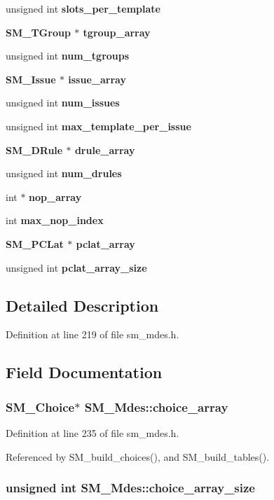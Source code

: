 \begin{CompactItemize}
unsigned int \bf{slots\_\-per\_\-template}
\item 
\bf{SM\_\-TGroup} $\ast$ \bf{tgroup\_\-array}
\item 
unsigned int \bf{num\_\-tgroups}
\item 
\bf{SM\_\-Issue} $\ast$ \bf{issue\_\-array}
\item 
unsigned int \bf{num\_\-issues}
\item 
unsigned int \bf{max\_\-template\_\-per\_\-issue}
\item 
\bf{SM\_\-DRule} $\ast$ \bf{drule\_\-array}
\item 
unsigned int \bf{num\_\-drules}
\item 
int $\ast$ \bf{nop\_\-array}
\item 
int \bf{max\_\-nop\_\-index}
\item 
\bf{SM\_\-PCLat} $\ast$ \bf{pclat\_\-array}
\item 
unsigned int \bf{pclat\_\-array\_\-size}
\end{CompactItemize}


\subsection{Detailed Description}




Definition at line 219 of file sm\_\-mdes.h.

\subsection{Field Documentation}
\subsubsection{\setlength{\rightskip}{0pt plus 5cm}\bf{SM\_\-Choice}$\ast$ \bf{SM\_\-Mdes::choice\_\-array}}\label{structSM__Mdes_18dbcf969d11f6cbe6872aca5cc53219}




Definition at line 235 of file sm\_\-mdes.h.

Referenced by SM\_\-build\_\-choices(), and SM\_\-build\_\-tables().
\subsubsection{\setlength{\rightskip}{0pt plus 5cm}unsigned int \bf{SM\_\-Mdes::choice\_\-array\_\-size}}\label{structSM__Mdes_28c7e18ccf5469a4832477c0407329ee}




